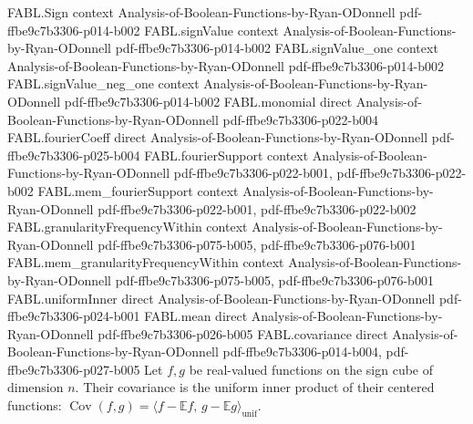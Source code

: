 \begin{theorem}
\label{FABL.covariance_eq_uniformInner_centered}
\leanok
{}
\proofstep
  {FABL.Sign}
  {context}
  {Analysis-of-Boolean-Functions-by-Ryan-ODonnell}
  {pdf-ffbe9c7b3306-p014-b002}
\proofstep
  {FABL.signValue}
  {context}
  {Analysis-of-Boolean-Functions-by-Ryan-ODonnell}
  {pdf-ffbe9c7b3306-p014-b002}
\proofstep
  {FABL.signValue_one}
  {context}
  {Analysis-of-Boolean-Functions-by-Ryan-ODonnell}
  {pdf-ffbe9c7b3306-p014-b002}
\proofstep
  {FABL.signValue_neg_one}
  {context}
  {Analysis-of-Boolean-Functions-by-Ryan-ODonnell}
  {pdf-ffbe9c7b3306-p014-b002}
\proofstep
  {FABL.monomial}
  {direct}
  {Analysis-of-Boolean-Functions-by-Ryan-ODonnell}
  {pdf-ffbe9c7b3306-p022-b004}
\proofstep
  {FABL.fourierCoeff}
  {direct}
  {Analysis-of-Boolean-Functions-by-Ryan-ODonnell}
  {pdf-ffbe9c7b3306-p025-b004}
\proofstep
  {FABL.fourierSupport}
  {context}
  {Analysis-of-Boolean-Functions-by-Ryan-ODonnell}
  {pdf-ffbe9c7b3306-p022-b001,
    pdf-ffbe9c7b3306-p022-b002}
\proofstep
  {FABL.mem_fourierSupport}
  {context}
  {Analysis-of-Boolean-Functions-by-Ryan-ODonnell}
  {pdf-ffbe9c7b3306-p022-b001,
    pdf-ffbe9c7b3306-p022-b002}
\proofstep
  {FABL.granularityFrequencyWithin}
  {context}
  {Analysis-of-Boolean-Functions-by-Ryan-ODonnell}
  {pdf-ffbe9c7b3306-p075-b005,
    pdf-ffbe9c7b3306-p076-b001}
\proofstep
  {FABL.mem_granularityFrequencyWithin}
  {context}
  {Analysis-of-Boolean-Functions-by-Ryan-ODonnell}
  {pdf-ffbe9c7b3306-p075-b005,
    pdf-ffbe9c7b3306-p076-b001}
\proofstep
  {FABL.uniformInner}
  {direct}
  {Analysis-of-Boolean-Functions-by-Ryan-ODonnell}
  {pdf-ffbe9c7b3306-p024-b001}
\proofstep
  {FABL.mean}
  {direct}
  {Analysis-of-Boolean-Functions-by-Ryan-ODonnell}
  {pdf-ffbe9c7b3306-p026-b005}
\proofstep
  {FABL.covariance}
  {direct}
  {Analysis-of-Boolean-Functions-by-Ryan-ODonnell}
  {pdf-ffbe9c7b3306-p014-b004,
    pdf-ffbe9c7b3306-p027-b005}
Let $f,g$ be real-valued functions on the sign cube of dimension $n$. Their covariance
is the uniform inner product of their centered functions:
$\operatorname{Cov}(f,g)=\langle f-\mathbb E f,\,g-\mathbb E g\rangle_{\mathrm{unif}}$.
\end{theorem}

